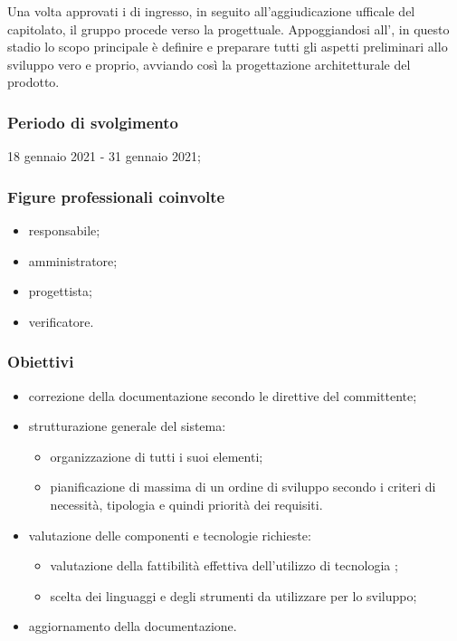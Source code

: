 Una volta approvati i  di ingresso, in seguito all'aggiudicazione ufficale del capitolato, il gruppo procede verso la  progettuale. Appoggiandosi all'\AdR{}, in questo stadio lo scopo principale è definire e preparare tutti gli aspetti preliminari allo sviluppo vero e proprio, avviando così la progettazione architetturale del prodotto.
        
        \subsubsection{Periodo di svolgimento}
        18 gennaio 2021 - 31 gennaio 2021;
        
        \subsubsection{Figure professionali coinvolte}
            \begin{itemize}
                \item responsabile;
                \item amministratore;
                \item progettista;
                \item verificatore.
            \end{itemize}

        \subsubsection{Obiettivi}
        \begin{itemize}
            \item correzione della documentazione secondo le direttive del committente;
            \item strutturazione generale del sistema:
            \begin{itemize}
                \item organizzazione di tutti i suoi elementi;
                \item pianificazione di massima di un ordine di sviluppo secondo i criteri di necessità, tipologia e quindi priorità dei requisiti.
            \end{itemize}
            \item valutazione delle componenti e tecnologie richieste:
            \begin{itemize}
                \item valutazione della fattibilità effettiva dell'utilizzo di tecnologia ;
                \item scelta dei linguaggi e degli strumenti da utilizzare per lo sviluppo;
            \end{itemize}
            \item aggiornamento della documentazione.
            
        \end{itemize}